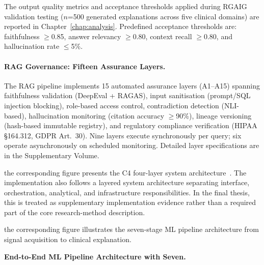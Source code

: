 The output quality metrics and acceptance thresholds applied during RGAIG validation testing ($n$=500 generated explanations across five clinical domains) are reported in Chapter~\ref{chap:analysis}. Predefined acceptance thresholds are: faithfulness $\geq$0.85, answer relevancy $\geq$0.80, context recall $\geq$0.80, and hallucination rate $\leq$5\%.


\paragraph{RAG Governance: Fifteen Assurance Layers.}

The RAG pipeline implements 15 automated assurance layers (A1--A15) spanning faithfulness validation (DeepEval + RAGAS), input sanitisation (prompt/SQL injection blocking), role-based access control, contradiction detection (NLI-based), hallucination monitoring (citation accuracy $\geq$90\%), lineage versioning (hash-based immutable registry), and regulatory compliance verification (HIPAA \S164.312, GDPR Art.~30). Nine layers execute synchronously per query; six operate asynchronously on scheduled monitoring. Detailed layer specifications are in the Supplementary Volume.


the corresponding figure presents the C4 four-layer system architecture~\cite{asthana2025eegmaster}.
The implementation also follows a layered system architecture separating interface, orchestration, analytical, and infrastructure responsibilities. In the final thesis, this is treated as supplementary implementation evidence rather than a required part of the core research-method description.


the corresponding figure illustrates the seven-stage ML pipeline architecture from signal acquisition to clinical explanation.


\noindent\textbf{End-to-End ML Pipeline Architecture with Seven.}

